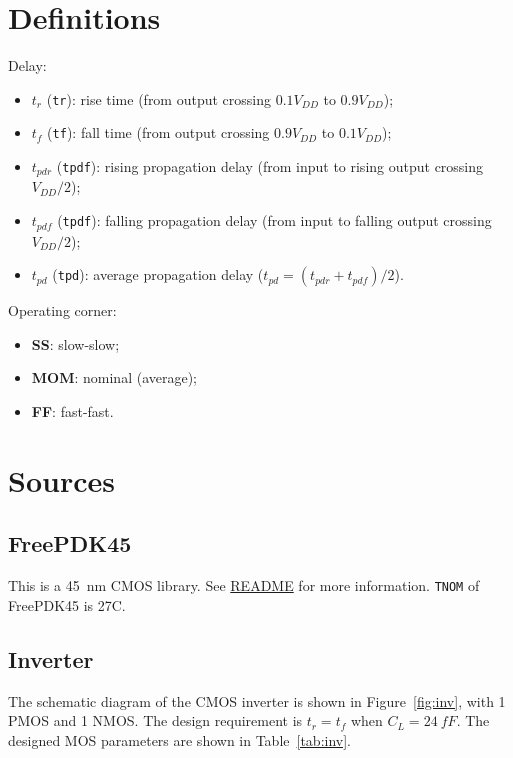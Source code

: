 \documentclass{scrartcl}
\begin{document}
  \section{Definitions}
    Delay:
    \begin{itemize}
      \item $t_r$ (\texttt{tr}): rise time (from output crossing $0.1V_{DD}$ to $0.9V_{DD}$);
      \item $t_f$ (\texttt{tf}): fall time (from output crossing $0.9V_{DD}$ to $0.1V_{DD}$);
      \item $t_{pdr}$ (\texttt{tpdf}): rising propagation delay (from input to rising output crossing $V_{DD}/2$);
      \item $t_{pdf}$ (\texttt{tpdf}): falling propagation delay (from input to falling output crossing $V_{DD}/2$);
      \item $t_{pd}$ (\texttt{tpd}): average propagation delay ($t_{pd} = (t_{pdr} + t_{pdf})/2$).
    \end{itemize}

    Operating corner:
    \begin{itemize}
      \item \textbf{SS}: slow-slow;
      \item \textbf{MOM}: nominal (average);
      \item \textbf{FF}: fast-fast.
    \end{itemize}
    

  \section{Sources}

    \subsection{FreePDK45}

      This is a \qty{45}{nm} CMOS library.
      See \href{https://github.com/Teddy-van-Jerry/ngspice-cmos/blob/master/FreePDK45/README}{README} for more information.
      \texttt{TNOM} of FreePDK45 is 27C.

    \subsection{Inverter}\label{s:inv}

      The schematic diagram of the CMOS inverter is shown in Figure~\ref{fig:inv},
      with 1 PMOS and 1 NMOS.
      The design requirement is $t_r=t_f$ when $C_L=\qty{24}{fF}$.
      The designed MOS parameters are shown in Table~\ref{tab:inv}.
\end{document}

